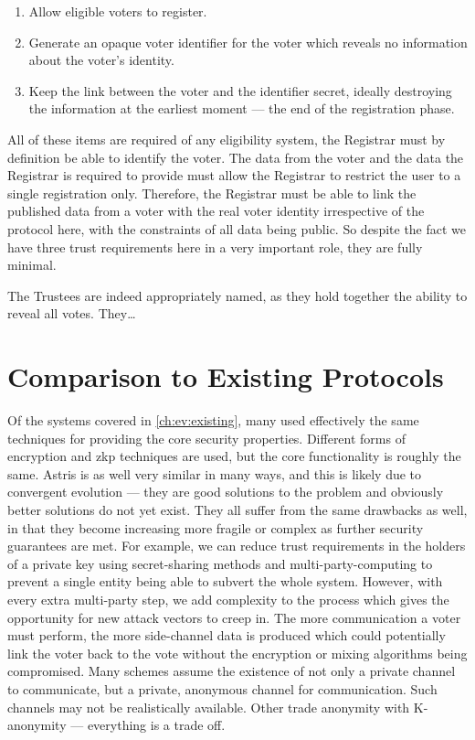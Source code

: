 \begin{enumerate}
    \item Allow eligible voters to register.
    \item Generate an opaque voter identifier for the voter which reveals no information about the voter's identity.
    \item Keep the link between the voter and the identifier secret, ideally destroying the information at the earliest moment --- the end of the registration phase.
\end{enumerate}

All of these items are required of any eligibility system, the Registrar must by definition be able to identify the voter. The data from the voter and the data the Registrar is required to provide must allow the Registrar to restrict the user to a single registration only. Therefore, the Registrar must be able to link the published data from a voter with the real voter identity irrespective of the protocol here, with the constraints of all data being public. So despite the fact we have three trust requirements here in a very important role, they are fully minimal.

The Trustees are indeed appropriately named, as they hold together the ability to reveal all votes. They\dots




\section{Comparison to Existing Protocols}
\label{ch:analysis:comparison}

Of the systems covered in \autoref{ch:ev:existing}, many used effectively the same techniques for providing the core security properties. Different forms of encryption and \gls{zkp} techniques are used, but the core functionality is roughly the same. Astris is as well very similar in many ways, and this is likely due to convergent evolution --- they are good solutions to the problem and obviously better solutions do not yet exist. They all suffer from the same drawbacks as well, in that they become increasing more fragile or complex as further security guarantees are met. For example, we can reduce trust requirements in the holders of a private key using secret-sharing methods and multi-party-computing to prevent a single entity being able to subvert the whole system. However, with every extra multi-party step, we add complexity to the process which gives the opportunity for new attack vectors to creep in. The more communication a voter must perform, the more side-channel data is produced which could potentially link the voter back to the vote without the encryption or mixing algorithms being compromised. Many schemes assume the existence of not only a private channel to communicate, but a private, anonymous channel for communication. Such channels may not be realistically available. Other trade anonymity with K-anonymity --- everything is a trade off.


